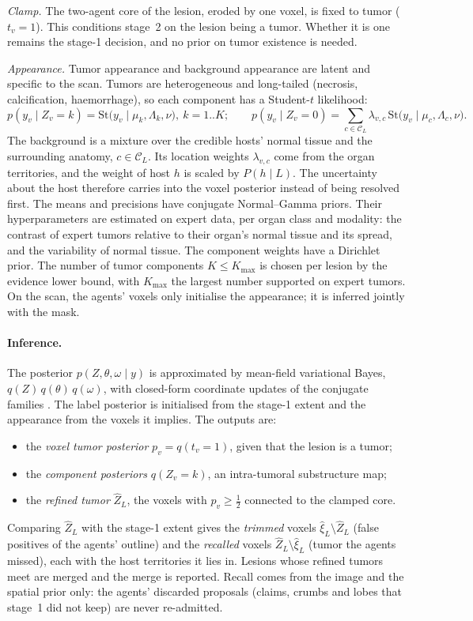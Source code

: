 \documentclass[fleqn,10pt]{olplainarticle}
\begin{document}
\emph{Clamp.} The two-agent core of the lesion, eroded by one voxel, is fixed to tumor ($t_v=1$). This conditions stage~2
on the lesion being a tumor. Whether it is one remains the stage-1 decision, and no prior on tumor existence is needed.

\emph{Appearance.} Tumor appearance and background appearance are latent and specific to the scan. Tumors are
heterogeneous and long-tailed (necrosis, calcification, haemorrhage), so each component has a Student-$t$ likelihood:
\begin{equation}
\label{eq:appearance}
p(y_v\mid Z_v=k)=\mathrm{St}\bigl(y_v\mid\mu_k,\Lambda_k,\nu\bigr),\ k=1..K;\qquad
p(y_v\mid Z_v=0)=\sum_{c\in\mathcal{C}_L}\lambda_{v,c}\,\mathrm{St}\bigl(y_v\mid\mu_c,\Lambda_c,\nu\bigr).
\end{equation}
The background is a mixture over the credible hosts' normal tissue and the surrounding anatomy, $c\in\mathcal{C}_L$. Its
location weights $\lambda_{v,c}$ come from the organ territories, and the weight of host $h$ is scaled by $P(h\mid L)$. The
uncertainty about the host therefore carries into the voxel posterior instead of being resolved first. The means and
precisions have conjugate Normal--Gamma priors. Their hyperparameters are estimated on expert data, per organ class and
modality: the contrast of expert tumors relative to their organ's normal tissue and its spread, and the variability of
normal tissue. The component weights have a Dirichlet prior. The number of tumor components $K\le K_{\max}$ is chosen per
lesion by the evidence lower bound, with $K_{\max}$ the largest number supported on expert tumors. On the scan, the agents'
voxels only initialise the appearance; it is inferred jointly with the mask.

\paragraph{Inference.} The posterior $p(Z,\theta,\omega\mid y)$ is approximated by mean-field variational Bayes,
$q(Z)\,q(\theta)\,q(\omega)$, with closed-form coordinate updates of the conjugate families \cite{gao2023bayeseg}. The
label posterior is initialised from the stage-1 extent and the appearance from the voxels it implies. The outputs are:
\begin{itemize}
\item the \emph{voxel tumor posterior} $p_v=q(t_v=1)$, given that the lesion is a tumor;
\item the \emph{component posteriors} $q(Z_v=k)$, an intra-tumoral substructure map;
\item the \emph{refined tumor} $\hat Z_L$, the voxels with $p_v\ge\tfrac12$ connected to the clamped core.
\end{itemize}
Comparing $\hat Z_L$ with the stage-1 extent gives the \emph{trimmed} voxels $\hat\xi_L\setminus\hat Z_L$ (false positives
of the agents' outline) and the \emph{recalled} voxels $\hat Z_L\setminus\hat\xi_L$ (tumor the agents missed), each with
the host territories it lies in. Lesions whose refined tumors meet are merged and the merge is reported. Recall comes from
the image and the spatial prior only: the agents' discarded proposals (claims, crumbs and lobes that stage~1 did not keep)
are never re-admitted.
\end{document}
